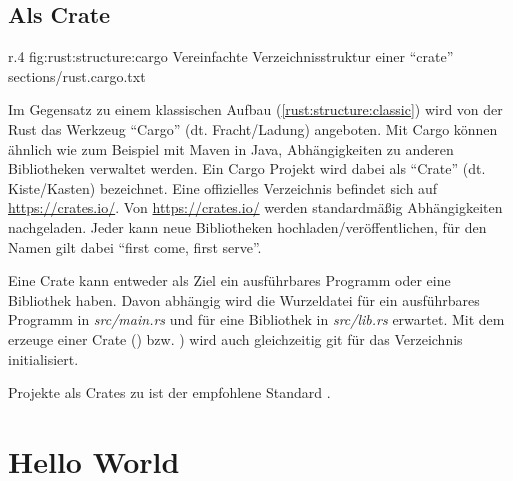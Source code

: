 \subsection{Als Crate}
\label{rust:structure:cargo}

\begin{wrapfigure}{r}{.4\textwidth}
	\rustcincludeml
		{fig:rust:structure:cargo}
		{Vereinfachte Verzeichnisstruktur einer \enquote{crate}}
		{sections/rust.cargo.txt}
\end{wrapfigure}



Im Gegensatz zu einem klassischen Aufbau (\autoref{rust:structure:classic}) wird von der Rust  das Werkzeug \enquote{Cargo} (dt. Fracht/Ladung) angeboten.
Mit Cargo können ähnlich wie zum Beispiel mit Maven  in Java, Abhängigkeiten zu anderen Bibliotheken verwaltet werden.
Ein Cargo Projekt wird dabei als \enquote{Crate} (dt. Kiste/Kasten) bezeichnet.
Eine offizielles Verzeichnis befindet sich auf \url{https://crates.io/}.
Von \url{https://crates.io/} werden standardmäßig Abhängigkeiten nachgeladen.
Jeder kann neue Bibliotheken hochladen/veröffentlichen, für den Namen gilt dabei \enquote{first come, first serve}.

Eine Crate kann entweder als Ziel ein ausführbares Programm oder eine Bibliothek haben.
Davon abhängig wird die Wurzeldatei für ein ausführbares Programm in \textit{src/main.rs} und für eine Bibliothek in \textit{src/lib.rs} erwartet.
Mit dem erzeuge einer Crate () bzw. ) wird auch gleichzeitig \gls{git} für das Verzeichnis initialisiert.

Projekte als Crates zu  ist der empfohlene Standard .







\section{Hello World}


